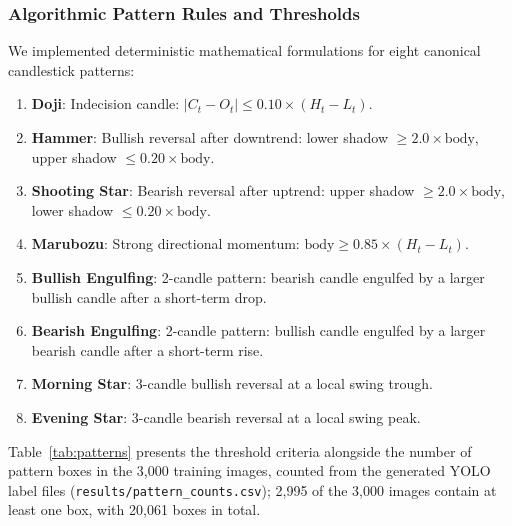 \documentclass[10pt,journal]{IEEEtran}
\begin{document}
\subsubsection{Algorithmic Pattern Rules and Thresholds}
We implemented deterministic mathematical formulations for eight canonical candlestick patterns:
\begin{enumerate}
  \item \textbf{Doji}: Indecision candle: $|C_t - O_t| \le 0.10 \times (H_t - L_t)$.
  \item \textbf{Hammer}: Bullish reversal after downtrend: lower shadow $\ge 2.0 \times \text{body}$, upper shadow $\le 0.20 \times \text{body}$.
  \item \textbf{Shooting Star}: Bearish reversal after uptrend: upper shadow $\ge 2.0 \times \text{body}$, lower shadow $\le 0.20 \times \text{body}$.
  \item \textbf{Marubozu}: Strong directional momentum: $\text{body} \ge 0.85 \times (H_t - L_t)$.
  \item \textbf{Bullish Engulfing}: 2-candle pattern: bearish candle engulfed by a larger bullish candle after a short-term drop.
  \item \textbf{Bearish Engulfing}: 2-candle pattern: bullish candle engulfed by a larger bearish candle after a short-term rise.
  \item \textbf{Morning Star}: 3-candle bullish reversal at a local swing trough.
  \item \textbf{Evening Star}: 3-candle bearish reversal at a local swing peak.
\end{enumerate}

Table~\ref{tab:patterns} presents the threshold criteria alongside the number of pattern boxes in the 3,000 training images, counted from the generated YOLO label files (\texttt{results/pattern\_counts.csv}); 2,995 of the 3,000 images contain at least one box, with 20,061 boxes in total.
\end{document}
